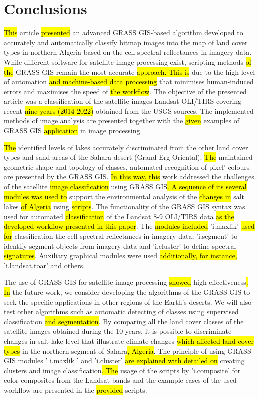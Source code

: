 \documentclass[asi,article,submit,pdftex,moreauthors]{Definitions/mdpi}
\begin{document}
\section{Conclusions}
\hl{This} article \hl{presented} an advanced GRASS GIS-based algorithm developed to accurately and automatically classify bitmap images into the map of land cover types in northern Algeria based on the cell spectral reflectances in imagery data. While different software for satellite image processing exist, scripting methods \hl{of the} GRASS GIS\hl{ }remain the most accurate \hl{approach. This is} due to the high level of automation \hl{and machine-based data processing }that minimises human-induced errors and maximises the speed of \hl{the workflow}. The objective of the presented article was a classification of the satellite images Landsat OLI/TIRS covering\hl{ }recent \hl{nine years (2014-2022)} obtained from the USGS sources. The implemented methods of image analysis are presented together with the \hl{given }examples of GRASS GIS \hl{application} in image processing. 

\hl{The} identified levels of lakes accurately discriminated from the other land cover types and sand areas of the Sahara desert (Grand Erg Oriental). \hl{The }maintained geometric shape and topology of classes, automated recognition of pixel’ colours are presented by the GRASS GIS. \hl{In this way, this} work addressed the challenges of the\hl{ }satellite \hl{image classification} using\hl{ }GRASS GIS\hl{. A sequence of its several modules was used to }support\hl{ }the environmental analysis of the \hl{changes in }salt lakes \hl{of Algeria} using \hl{scripts}. The functionality of the GRASS GIS syntax was used for automated \hl{classification} of the Landsat 8-9 OLI/TIRS data \hl{as the developed workflow presented in this paper}. The \hl{modules included }'i.maxlik' \hl{used for} classification the cell spectral reflectances in imagery data, 'i.segment' to identify segment objects from imagery data and 'i.cluster' to define spectral \hl{signatures}. Auxiliary graphical modules were used \hl{additionally, for instance, }'i.landsat.toar' and others. 

The use of GRASS GIS for satellite image processing \hl{showed }high effectiveness\hl{. In} the future work, we consider developing the algorithms of the GRASS GIS to seek the specific applications in other regions of the Earth's deserts. We will also test other algorithms such as automatic detecting of classes using supervised classification \hl{and segmentation}. By comparing all the land cover classes of the satellite images obtained during the 10 years, it is possible to discriminate changes in salt lake level that illustrate \hl{ }climate changes\hl{ which affected land cover types }in the northern segment of Sahara\hl{, Algeria}. The principle of using GRASS GIS modules ' i.maxlik ' and 'i.cluster' \hl{are explained with detailed on }creating clusters and image classification\hl{. The} usage of the scripts by 'i.composite' for color composites from the Landsat bands and the example cases of the used workflow are presented in the \hl{provided }scripts. 
\end{document}
